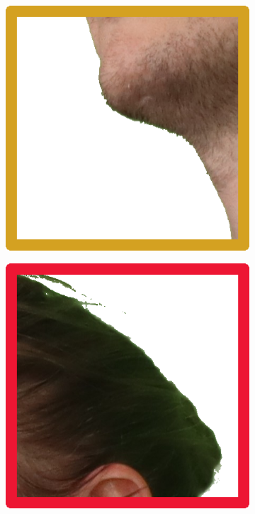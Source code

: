 \begin{figure}[h]
\begin{subfigure}{0.2\linewidth}
	\end{subfigure}
	\begin{subfigure}{0.2\linewidth}
		\includegraphics[width=\textwidth]{Figures/processed/cropped_clean_6-B-6-2-163452-598 (1).png}
	\end{subfigure}
	\begin{subfigure}{0.2\linewidth}
		\includegraphics[width=\textwidth]{Figures/processed/cropped_clean_6-B-6-2-163452-598.png}

\end{subfigure}
\end{figure}
